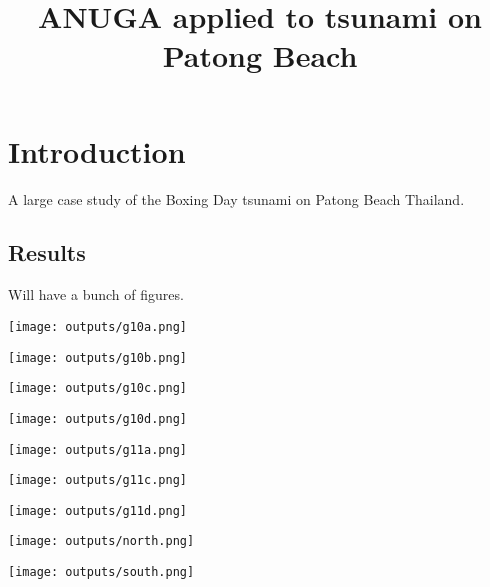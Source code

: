 \documentclass{article}
\begin{document}
\title{ANUGA applied to tsunami on Patong Beach}

\maketitle

\section{Introduction}

A large case study of the Boxing Day tsunami on Patong Beach Thailand. 

\subsection{Results}


Will have a bunch of figures.


\begin{center}
\texttt{[image: outputs/g10a.png]}
\end{center}

\begin{center}
\texttt{[image: outputs/g10b.png]}
\end{center}

\begin{center}
\texttt{[image: outputs/g10c.png]}
\end{center}

\begin{center}
\texttt{[image: outputs/g10d.png]}
\end{center}

\begin{center}
\texttt{[image: outputs/g11a.png]}
\end{center}

\begin{center}
\texttt{[image: outputs/g11c.png]}
\end{center}

\begin{center}
\texttt{[image: outputs/g11d.png]}
\end{center}

\begin{center}
\texttt{[image: outputs/north.png]}
\end{center}

\begin{center}
\texttt{[image: outputs/south.png]}
\end{center}
\end{document}
